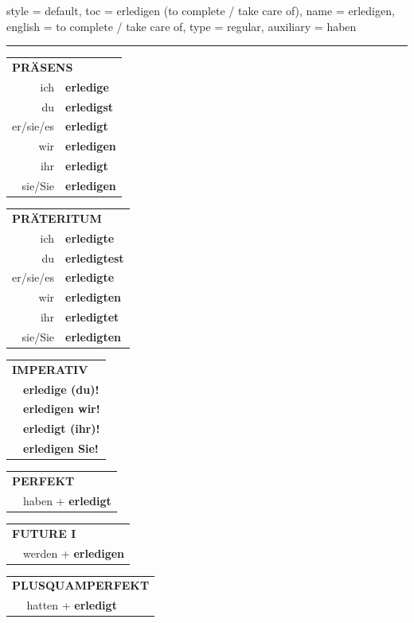 \begin{verbentry}{
  style = {default},
  toc = {erledigen (to complete / take care of)},
  name = {erledigen},
  english = {to complete / take care of},
  type = {regular},
  auxiliary = {haben}
}
 

\vspace{5pt}
\hrule
\vspace{5pt}

\begin{tabular}{rl}
\multicolumn{2}{l}{\textbf{PRÄSENS}}\\
ich & \textbf{erledige}\\
du & \textbf{erledigst}\\
er/sie/es & \textbf{erledigt}\\
wir & \textbf{erledigen}\\
ihr & \textbf{erledigt}\\
sie/Sie & \textbf{erledigen}\\
\end{tabular}
\hfill
\begin{tabular}{rl}
\multicolumn{2}{l}{\textbf{PRÄTERITUM}}\\
ich & \textbf{erledigte}\\
du & \textbf{erledigtest}\\
er/sie/es & \textbf{erledigte}\\
wir & \textbf{erledigten}\\
ihr & \textbf{erledigtet}\\
sie/Sie & \textbf{erledigten}\\
\end{tabular}
\hfill
\begin{tabular}{rl}
\multicolumn{2}{l}{\textbf{IMPERATIV}}\\
& \textbf{erledige (du)!}\\
& \textbf{erledigen wir!}\\
& \textbf{erledigt (ihr)!}\\
& \textbf{erledigen Sie!}\\
\end{tabular}

\vspace{10pt}

\begin{tabular}{rl}
\multicolumn{2}{l}{\textbf{PERFEKT}}\\
& haben + \textbf{erledigt}\\
\end{tabular}
\hfill
\begin{tabular}{rl}
\multicolumn{2}{l}{\textbf{FUTURE I}}\\
& werden + \textbf{erledigen}\\
\end{tabular}
\hfill
\begin{tabular}{rl}
\multicolumn{2}{l}{\textbf{PLUSQUAMPERFEKT}}\\
& hatten + \textbf{erledigt}\\
\end{tabular}


\end{verbentry}
